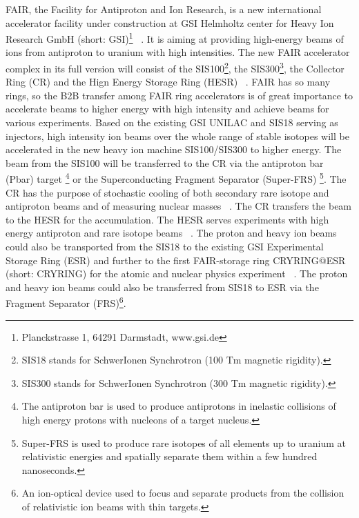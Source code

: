 \gls{FAIR}, the Facility for Antiproton and Ion Research, is a new international accelerator facility under construction at \gls{GSI} Helmholtz center for Heavy Ion Research GmbH (short: GSI)\footnote{Planckstrasse 1, 64291 Darmstadt, www.gsi.de} ~\cite{eschke_international_2005, noauthor_fair_2011}. It is aiming at providing high-energy beams of ions from antiproton to uranium with high intensities. The new FAIR accelerator complex in its full version will consist of the \gls{SIS100}\footnote{SIS18 stands for SchwerIonen Synchrotron (100 Tm magnetic rigidity).}, the SIS300\footnote{SIS300 stands for SchwerIonen Synchrotron (300 Tm magnetic rigidity).}, the Collector Ring (\gls{CR}) and the Hign Energy Storage Ring (\gls{HESR}) ~\cite{spiller_fair_2006, steck_advanced_2009}. FAIR has so many rings, so the B2B transfer among FAIR ring accelerators is of great importance to accelerate beams to higher energy with high intensity and achieve beams for various experiments. Based on the existing GSI \gls{UNILAC} and \gls{SIS18} serving as injectors, high intensity ion beams over the whole range of stable isotopes will be accelerated in the new heavy ion machine SIS100/\gls{SIS300} to higher energy. The beam from the SIS100 will be transferred to the CR via the antiproton bar (\gls{Pbar}) target \footnote{The antiproton bar is used to produce antiprotons in inelastic collisions of high energy protons with nucleons of a target nucleus.} or the Superconducting Fragment Separator (Super-FRS) \footnote{Super-FRS is used to produce rare isotopes of all elements up to uranium at relativistic energies and spatially separate them within a few hundred nanoseconds.}. The CR has the purpose of stochastic cooling of both secondary rare isotope and antiproton beams and of measuring nuclear masses ~\cite{nolden_collector_2006, bar_technical_2013}. The CR transfers the beam to the HESR for the accumulation. The HESR serves experiments with high energy antiproton and rare isotope beams ~\cite{toelle_hesr_2007}. The proton and heavy ion beams could also be transported from the SIS18 to the existing GSI Experimental Storage Ring (\gls{ESR}) and further to the first FAIR-storage ring CRYRING@ESR (short: CRYRING) for the atomic and nuclear physics experiment ~\cite{lestinsky_cryring_2015, lestinsky_cryring_2012}. The proton and heavy ion beams could also be transferred from SIS18 to ESR via the Fragment Separator (\gls{FRS})\footnote{An ion-optical device used to focus and separate products from the collision of relativistic ion beams with thin targets.}.

